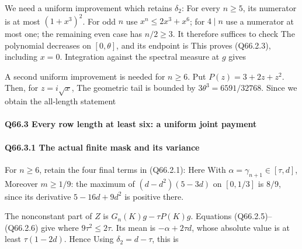 We need a uniform improvement which retains \(\delta_2\):
For every \(n\ge5\), its numerator is at most \((1+x^3)^2\).
For odd \(n\) use \(x^n\le2x^3+x^6\); for \(4\mid n\)
use a numerator at most one; the remaining even case has
\(n/2\ge3\). It therefore suffices to check
The polynomial decreases on \([0,\allowbreak  \theta]\), and its endpoint is
This proves (Q66.2.3), including \(x=0\).
Integration against the spectral measure at \(g\) gives

A second uniform improvement is needed for \(n\ge6\). Put
\(P(z)=3+2z+z^2\). Then, for \(z=i\sqrt x\),
The geometric tail is bounded by \(3\theta^3=6591/32768\).
Since
we obtain the all-length statement

\paragraph{Q66.3 Every row length at least six: a uniform joint payment}

\paragraph{Q66.3.1 The actual finite mask and its variance}

For \(n\ge6\), retain the four final terms in (Q66.2.1):
Here
With \(\alpha=\gamma_{n+1}\in[\tau,\allowbreak  d]\),
Moreover \(m\ge1/9\): the maximum of
\((d-d^2)(5-3d)\) on \([0,\allowbreak  1/3]\) is \(8/9\), since its
derivative \(5-16d+9d^2\) is positive there.

The nonconstant part of \(Z\) is
\(G_n(K)g-\tau P(K)g\). Equations (Q66.2.5)--(Q66.2.6) give
where \(9\tau^2\le2\tau\). Its mean is
\(-\alpha+2\tau d\), whose absolute value is at least
\(\tau(1-2d)\). Hence
Using \(\delta_2=d-\tau\), this is

